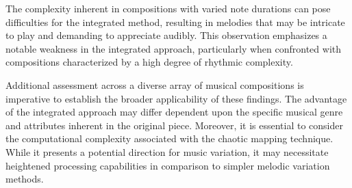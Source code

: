 \documentclass[11pt]{article}
\theoremstyle{definition}
\begin{document}
The complexity inherent in compositions with varied note durations can pose difficulties for the integrated method, resulting in melodies that may be intricate to play and demanding to appreciate audibly. 
This observation emphasizes a notable weakness in the integrated approach, particularly when confronted with compositions characterized by a high degree of rhythmic complexity.

Additional assessment across a diverse array of musical compositions is imperative to establish the broader applicability of these findings. 
The advantage of the integrated approach may differ dependent upon the specific musical genre and attributes inherent in the original piece. 
Moreover, it is essential to consider the computational complexity associated with the chaotic mapping technique. 
While it presents a potential direction for music variation, it may necessitate heightened processing capabilities in comparison to simpler melodic variation methods.
\end{document}
